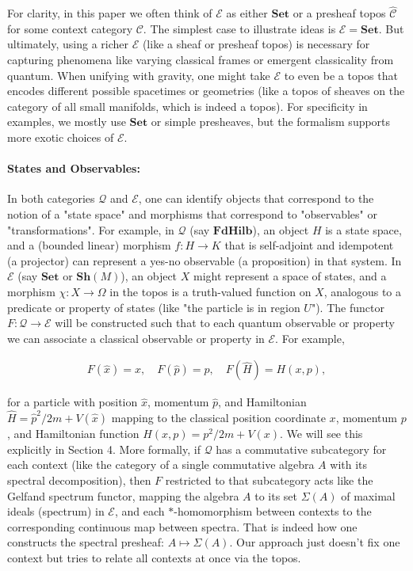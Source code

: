 \medskip

For clarity, in this paper we often think of $\mathcal{E}$ as either $\mathbf{Set}$ or a presheaf topos $\widehat{\mathcal{C}}$ for some context category $\mathcal{C}$. The simplest case to illustrate ideas is $\mathcal{E}=\mathbf{Set}$. But ultimately, using a richer $\mathcal{E}$ (like a sheaf or presheaf topos) is necessary for capturing phenomena like varying classical frames or emergent classicality from quantum. When unifying with gravity, one might take $\mathcal{E}$ to even be a topos that encodes different possible spacetimes or geometries (like a topos of sheaves on the category of all small manifolds, which is indeed a topos). For specificity in examples, we mostly use $\mathbf{Set}$ or simple presheaves, but the formalism supports more exotic choices of $\mathcal{E}$.

\paragraph{States and Observables:} 
In both categories $\mathcal{Q}$ and $\mathcal{E}$, one can identify objects that correspond to the notion of a "state space" and morphisms that correspond to "observables" or "transformations". For example, in $\mathcal{Q}$ (say $\mathbf{FdHilb}$), an object $H$ is a state space, and a (bounded linear) morphism $f: H \to K$ that is self-adjoint and idempotent (a projector) can represent a yes-no observable (a proposition) in that system. In $\mathcal{E}$ (say $\mathbf{Set}$ or $\mathbf{Sh}(M)$), an object $X$ might represent a space of states, and a morphism $\chi: X \to \Omega$ in the topos is a truth-valued function on $X$, analogous to a predicate or property of states (like "the particle is in region $U$"). The functor $F: \mathcal{Q}\to\mathcal{E}$ will be constructed such that to each quantum observable or property we can associate a classical observable or property in $\mathcal{E}$. For example,

\begin{align}
F(\hat{x}) = x, \quad F(\hat{p}) = p, \quad F(\hat{H}) = H(x,p),
\end{align}

for a particle with position $\hat{x}$, momentum $\hat{p}$, and Hamiltonian $\hat{H} = \hat{p}^2/2m + V(\hat{x})$ mapping to the classical position coordinate $x$, momentum $p$, and Hamiltonian function $H(x,p) = p^2/2m + V(x)$. We will see this explicitly in Section 4. More formally, if $\mathcal{Q}$ has a commutative subcategory for each context (like the category of a single commutative algebra $A$ with its spectral decomposition), then $F$ restricted to that subcategory acts like the Gelfand spectrum functor, mapping the algebra $A$ to its set $\Sigma(A)$ of maximal ideals (spectrum) in $\mathcal{E}$, and each $*$-homomorphism between contexts to the corresponding continuous map between spectra. That is indeed how one constructs the spectral presheaf: $A \mapsto \Sigma(A)$. Our approach just doesn't fix one context but tries to relate all contexts at once via the topos.

